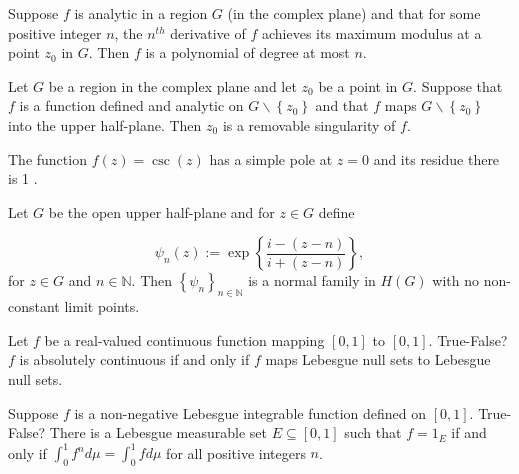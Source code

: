 \documentclass[14pt]{extarticle}
\begin{document}
Suppose $f$ is analytic in a region $G$ (in the complex plane) and that for some positive integer $n$, the $n^{t h}$ derivative of $f$ achieves its maximum modulus at a point $z_{0}$ in $G$. Then $f$ is a polynomial of degree at most $n$.
\newpage

Let $G$ be a region in the complex plane and let $z_{0}$ be a point in $G$. Suppose that $f$ is a function defined and analytic on $G \backslash\left\{z_{0}\right\}$ and that $f$ maps $G \backslash\left\{z_{0}\right\}$ into the upper half-plane. Then $z_{0}$ is a removable singularity of $f$.
\newpage

The function $f(z)=\csc (z)$ has a simple pole at $z=0$ and its residue there is 1 .
\newpage

Let $G$ be the open upper half-plane and for $z \in G$ define

$$
\psi_{n}(z):=\exp \left\{\frac{i-(z-n)}{i+(z-n)}\right\},
$$
for $z \in G$ and $n \in \mathbb{N}$. Then $\left\{\psi_{n}\right\}_{n \in \mathbb{N}}$ is a normal family in $H(G)$ with no non-constant limit points.
\newpage

Let $f$ be a real-valued continuous function mapping $[0,1]$ to $[0,1]$. True-False? $f$ is absolutely continuous if and only if $f$ maps Lebesgue null sets to Lebesgue null sets.
\newpage

Suppose $f$ is a non-negative Lebesgue integrable function defined on $[0,1]$. True-False? There is a Lebesgue measurable set $E \subseteq[0,1]$ such that $f=1_{E}$ if and only if $\int_{0}^{1} f^{n} d \mu=\int_{0}^{1} f d \mu$ for all positive integers $n$.
\newpage
\end{document}

